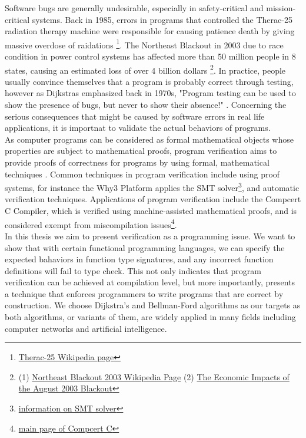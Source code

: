 Software bugs are generally undesirable, especially in safety-critical and mission-critical systems. Back in 1985, errors in programs that controlled the Therac-25 radiation therapy machine were responsible for causing patience death by giving massive overdose of raidations \footnote{\href{https://en.wikipedia.org/wiki/Therac-25}{Therac-25 Wikipedia page}}. The Northeast Blackout in 2003 due to race condition in power control systems has affected more than 50 million people in 8 states, causing an estimated loss of over 4 billion dollars \footnote{(1) \href{https://en.wikipedia.org/wiki/Northeast_blackout_of_2003}{Northeast Blackout 2003 Wikipedia Page} (2) \href{https://elcon.org/wp-content/uploads/Economic20Impacts20of20August20200320Blackout1.pdf}{The Economic Impacts of the August 2003 Blackout}}. In practice, people usually convince themselves that a program is probably correct through testing, however as Dijkstras emphasized back in 1970s, "Program testing can be used to show the presence of bugs, but never to show their absence!" \cite{DijkstrasQuote}. Concerning the serious consequences that might be caused by software errors in real life applications, it is importnat to validate the actual behaviors of programs. 
\\

As computer programs can be considered as formal mathematical objects whose properties are subject to mathematical proofs, program verification aims to provide proofs of correctness for programs by using formal, mathematical techniques \cite{Moore}. Common techniques in program verification include using proof systems, for instance the Why3 Platform \cite{why3} applies the SMT solver\footnote{\href{https://en.wikipedia.org/wiki/Satisfiability_modulo_theories}{information on SMT solver}}, and automatic verification techniques. Applications of program verification include the Compcert C Compiler, which is verified using machine-assisted mathematical proofs, and is considered exempt from miscompilation issues\footnote{\href{http://compcert.inria.fr/compcert-C.html}{main page of Compcert C}}. 
\\

In this thesis we aim to present verification as a programming issue. We want to show that with certain functional programming languages, we can specify the expected bahaviors in function type signatures, and any incorrect function definitions will fail to type check. This not only indicates that program verification can be achieved at compilation level, but more importantly, presents a technique that enforces programmers to write programs that are correct by construction. We choose Dijkstra's and Bellman-Ford algorithms as our targets as both algorithms, or variants of them, are widely applied in many fields including computer networks and artificial intelligence. 
\\

